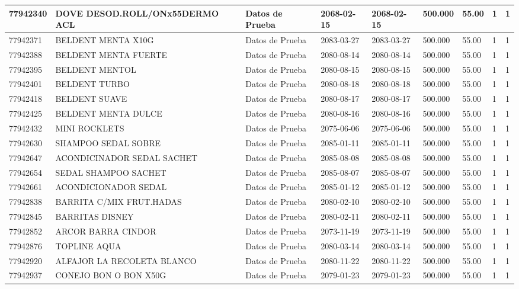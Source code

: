\documentclass[a4paper,12pt]{article}
\begin{document}
\begin{landscape}
\begin{longtable}{|p{4cm}|p{2.5cm}|p{2.5cm}|p{1.8cm}|p{1.8cm}|p{1cm}|p{1cm}|p{3cm}|p{3cm}||}
77942340 & DOVE DESOD.ROLL/ONx55DERMO ACL & Datos de Prueba & 2068-02-15 & 2068-02-15 & 500.000 & 55.00 & 1 & 1 \\ \hline 
77942371 & BELDENT MENTA X10G & Datos de Prueba & 2083-03-27 & 2083-03-27 & 500.000 & 55.00 & 1 & 1 \\ \hline 
77942388 & BELDENT MENTA FUERTE & Datos de Prueba & 2080-08-14 & 2080-08-14 & 500.000 & 55.00 & 1 & 1 \\ \hline 
77942395 & BELDENT MENTOL & Datos de Prueba & 2080-08-15 & 2080-08-15 & 500.000 & 55.00 & 1 & 1 \\ \hline 
77942401 & BELDENT TURBO & Datos de Prueba & 2080-08-18 & 2080-08-18 & 500.000 & 55.00 & 1 & 1 \\ \hline 
77942418 & BELDENT SUAVE & Datos de Prueba & 2080-08-17 & 2080-08-17 & 500.000 & 55.00 & 1 & 1 \\ \hline 
77942425 & BELDENT MENTA DULCE & Datos de Prueba & 2080-08-16 & 2080-08-16 & 500.000 & 55.00 & 1 & 1 \\ \hline 
77942432 & MINI ROCKLETS & Datos de Prueba & 2075-06-06 & 2075-06-06 & 500.000 & 55.00 & 1 & 1 \\ \hline 
77942630 & SHAMPOO   SEDAL  SOBRE & Datos de Prueba & 2085-01-11 & 2085-01-11 & 500.000 & 55.00 & 1 & 1 \\ \hline 
77942647 & ACONDICINADOR  SEDAL   SACHET & Datos de Prueba & 2085-08-08 & 2085-08-08 & 500.000 & 55.00 & 1 & 1 \\ \hline 
77942654 & SEDAL   SHAMPOO SACHET & Datos de Prueba & 2085-08-07 & 2085-08-07 & 500.000 & 55.00 & 1 & 1 \\ \hline 
77942661 & ACONDICIONADOR  SEDAL & Datos de Prueba & 2085-01-12 & 2085-01-12 & 500.000 & 55.00 & 1 & 1 \\ \hline 
77942838 & BARRITA C/MIX FRUT.HADAS & Datos de Prueba & 2080-02-10 & 2080-02-10 & 500.000 & 55.00 & 1 & 1 \\ \hline 
77942845 & BARRITAS DISNEY & Datos de Prueba & 2080-02-11 & 2080-02-11 & 500.000 & 55.00 & 1 & 1 \\ \hline 
77942852 & ARCOR BARRA CINDOR & Datos de Prueba & 2073-11-19 & 2073-11-19 & 500.000 & 55.00 & 1 & 1 \\ \hline 
77942876 & TOPLINE AQUA & Datos de Prueba & 2080-03-14 & 2080-03-14 & 500.000 & 55.00 & 1 & 1 \\ \hline 
77942920 & ALFAJOR LA RECOLETA BLANCO & Datos de Prueba & 2080-11-22 & 2080-11-22 & 500.000 & 55.00 & 1 & 1 \\ \hline 
77942937 & CONEJO BON O BON X50G & Datos de Prueba & 2079-01-23 & 2079-01-23 & 500.000 & 55.00 & 1 & 1 \\ \hline 

\end{longtable}
\end{landscape}
\end{document}
